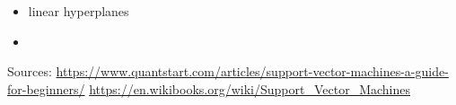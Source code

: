 \begin{itemize}
  \item linear hyperplanes
  \item 

\end{itemize}

Sources:
\url{https://www.quantstart.com/articles/support-vector-machines-a-guide-for-beginners/}
\url{https://en.wikibooks.org/wiki/Support_Vector_Machines}
